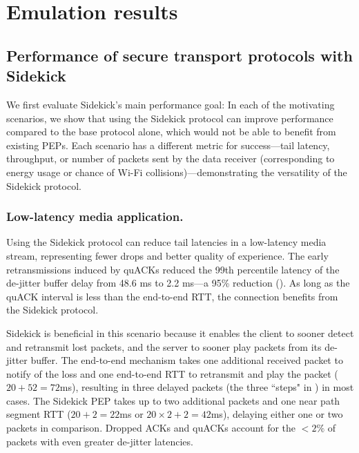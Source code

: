 \section{Emulation results}
\label{sec:sidekick:emulation}



\subsection{Performance of secure transport protocols with Sidekick}
\label{sec:sidekick:emulation:performance}

We first evaluate Sidekick's main performance goal: In each of the motivating
scenarios, we show that using the Sidekick protocol can improve performance compared
to the base protocol alone, which would not be able to benefit from existing
PEPs. Each scenario has a different metric for success---tail latency,
throughput, or number of packets sent by the data receiver (corresponding to
energy usage or chance of Wi-Fi collisions)---demonstrating the versatility of
the Sidekick protocol.

\subsubsection{Low-latency media application.}

Using the Sidekick protocol can reduce tail latencies in a low-latency media stream,
representing fewer drops and better quality of experience. The early
retransmissions induced by quACKs reduced the 99th percentile latency of
the de-jitter buffer delay from 48.6 ms to 2.2 ms---a 95\% reduction
(). As long as the quACK interval is less
than the end-to-end RTT, the connection benefits from the Sidekick protocol.

Sidekick is beneficial in this scenario because it enables the client to
sooner detect and retransmit lost packets, and the server to sooner play
packets from its de-jitter buffer. The end-to-end mechanism takes one
additional received packet to notify of the loss and one end-to-end RTT to
retransmit and play the packet ($20+52=72$ms), resulting in three delayed
packets (the three ``steps" in ) in most
cases. The Sidekick PEP takes up to two additional packets and one near path
segment RTT ($20+2=22$ms or $20\times2+2=42$ms), delaying either one or two
packets in comparison. Dropped ACKs and quACKs account for the $<2\%$ of
packets with even greater de-jitter latencies.

